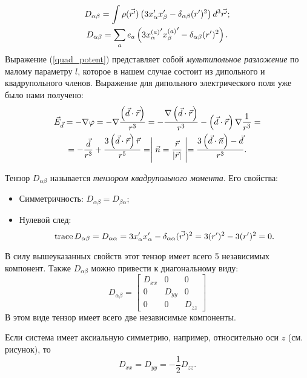     \begin{gather*}
        D_{\alpha\beta} = \int\rho(\vec{r'})\left({3x_{\alpha}'x_{\beta}' - \delta_{\alpha\beta}(r')^2}\right)d^3\vec{r'};\\
        D_{\alpha\beta} = \sum_a e_a \left({3{x_{\alpha}^{(a)}}' {x_{\beta}^{(a)}}' - \delta_{\alpha\beta}(r')^2}\right).
    \end{gather*}
    Выражение (\ref{quad_potent}) представляет собой \textit{мультипольное разложение} по малому параметру $l$, которое в нашем случае состоит из дипольного и квадрупольного членов.
    Выражение для дипольного электрического поля уже было нами получено:
    \begin{gather*}
        \vec{E}_{\vec{d}} = -\nabla\varphi = -\nabla\frac{\left({\vec{d}\cdot\vec{r}}\right)}{r^3} = -\frac{\nabla\left({\vec{d}\cdot\vec{r}}\right)}{r^3} - \left({\vec{d}\cdot\vec{r}}\right)\nabla\frac{1}{r^3} = \\
        = -\frac{\vec{d}}{r^3} + \frac{3\left({\vec{d}\cdot\vec{r}}\right)\vec{r}}{r^5} = \Biggm| \vec{n} = \frac{\vec{r}}{\left|{\vec{r}}\right|} \Biggm| = \frac{3\left({\vec{d}\cdot\vec{n}}\right) - \vec{d}}{r^3}.
    \end{gather*}

    Тензор $D_{\alpha\beta}$ называется \textit{тензором квадрупольного момента}. Его свойства:
    \begin{itemize}
        \item Симметричность: $D_{\alpha\beta} = D_{\beta\alpha}$;
        \item Нулевой след: 
            \[
                \operatorname{trace} D_{\alpha\beta} = D_{\alpha\alpha} = 3x_{\alpha}'x_{\alpha}' - \delta_{\alpha\alpha}(\vec{r'})^2 = 3(r')^2 - 3(r')^2 = 0.
            \]
    \end{itemize}
    В силу вышеуказанных свойств этот тензор имеет всего 5 независимых компонент. Также $D_{\alpha\beta}$ можно привести к диагональному виду:
    \[
        D_{\alpha\beta} = \begin{bmatrix}
            D_{xx} & 0 & 0 \\
            0 & D_{yy} & 0 \\
            0 & 0 & D_{zz}
        \end{bmatrix}
    \]
    В этом виде тензор имеет всего две независимые компоненты.

        \parbox[h]{3cm}{
            
        }
        \hfill
        \parbox[h]{12cm}{
            Если система имеет аксиальную симметрию, например, относительно оси $z$ (см. рисунок), то
            \[
                D_{xx} = D_{yy} = -\frac 12 D_{zz}.
            \]
        }
    
